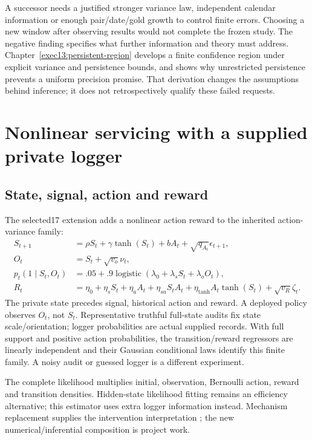 A successor needs a justified stronger variance law, independent calendar information or enough pair/date/gold growth to control finite errors. Choosing a new window after observing results would not complete the frozen study. The negative finding specifies what further information and theory must address. Chapter~\ref{exec13:persistent-region} develops a finite confidence region under explicit variance and persistence bounds, and shows why unrestricted persistence prevents a uniform precision promise. That derivation changes the assumptions behind inference; it does not retrospectively qualify these failed requests.

\section{Nonlinear servicing with a supplied private logger}
\subsection{State, signal, action and reward}
The selected17 extension adds a nonlinear action reward to the inherited action-variance family:
\begin{align*}
 S_{t+1}&=\rho S_t+\gamma\tanh(S_t)+bA_t+\sqrt{q_{A_t}}\epsilon_{t+1},\\
 O_t&=S_t+\sqrt{v_o}\nu_t,\\
 p_t(1\mid S_t,O_t)&=.05+.9\operatorname{logistic}(\lambda_0+\lambda_sS_t+\lambda_oO_t),\\
 R_t&=\eta_0+\eta_sS_t+\eta_aA_t+\eta_{sa}S_tA_t+
 \eta_{\tanh}A_t\tanh(S_t)+\sqrt{v_R}\zeta_t.
\end{align*}
The private state precedes signal, historical action and reward. A deployed policy observes $O_t$, not $S_t$. Representative truthful full-state audits fix state scale/orientation; logger probabilities are actual supplied records. With full support and positive action probabilities, the transition/reward regressors are linearly independent and their Gaussian conditional laws identify this finite family. A noisy audit or guessed logger is a different experiment.

The complete likelihood multiplies initial, observation, Bernoulli action, reward and transition densities. Hidden-state likelihood fitting remains an efficiency alternative; this estimator uses extra logger information instead. Mechanism replacement supplies the intervention interpretation \citep{pearl2009}; the new numerical/inferential composition is project work.

